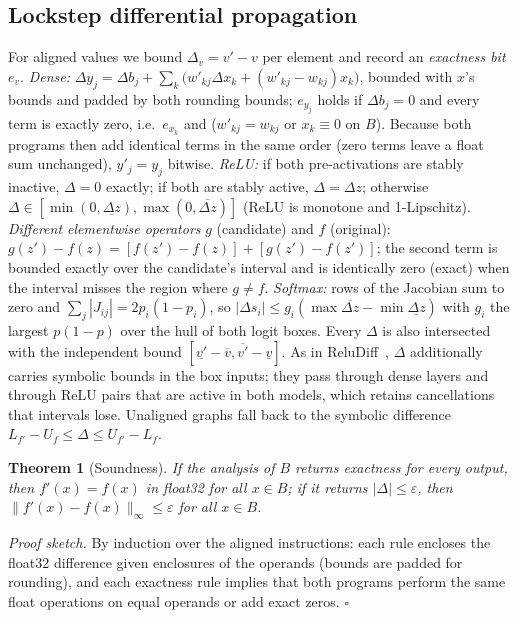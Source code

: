 \documentclass[conference]{IEEEtran}
\newtheorem{theorem}{Theorem}
\begin{document}
\subsection{Lockstep differential propagation}
For aligned values we bound $\Delta_v=v'-v$ per element and record an \emph{exactness bit} $e_v$.
\emph{Dense:} $\Delta y_j=\Delta b_j+\sum_k\big(w'_{kj}\Delta x_k+(w'_{kj}-w_{kj})x_k\big)$, bounded with $x$'s bounds and padded by both rounding bounds; $e_{y_j}$ holds if $\Delta b_j=0$ and every term is exactly zero, i.e.\ $e_{x_k}$ and ($w'_{kj}=w_{kj}$ or $x_k\equiv0$ on $B$). Because both programs then add identical terms in the same order (zero terms leave a float sum unchanged), $y'_j=y_j$ bitwise.
\emph{ReLU:} if both pre-activations are stably inactive, $\Delta=0$ exactly; if both are stably active, $\Delta=\Delta z$; otherwise $\Delta\in[\min(0,\underline{\Delta z}),\max(0,\overline{\Delta z})]$ (ReLU is monotone and 1-Lipschitz).
\emph{Different elementwise operators} $g$ (candidate) and $f$ (original): $g(z')-f(z)=[f(z')-f(z)]+[g(z')-f(z')]$; the second term is bounded exactly over the candidate's interval and is identically zero (exact) when the interval misses the region where $g\ne f$.
\emph{Softmax:} rows of the Jacobian sum to zero and $\sum_j|J_{ij}|=2p_i(1-p_i)$, so $|\Delta s_i|\le g_i(\max\overline{\Delta z}-\min\underline{\Delta z})$ with $g_i$ the largest $p(1-p)$ over the hull of both logit boxes.
Every $\Delta$ is also intersected with the independent bound $[\underline{v'}-\overline{v},\overline{v'}-\underline{v}]$. As in ReluDiff~\cite{reludiff,neurodiff}, $\Delta$ additionally carries symbolic bounds in the box inputs; they pass through dense layers and through ReLU pairs that are active in both models, which retains cancellations that intervals lose. Unaligned graphs fall back to the symbolic difference $L_{f'}-U_f\le\Delta\le U_{f'}-L_f$.

\begin{theorem}[Soundness]
If the analysis of $B$ returns exactness for every output, then $f'(x)=f(x)$ in float32 for all $x\in B$; if it returns $|\Delta|\le\varepsilon$, then $\|f'(x)-f(x)\|_\infty\le\varepsilon$ for all $x\in B$.
\end{theorem}
\noindent\emph{Proof sketch.} By induction over the aligned instructions: each rule encloses the float32 difference given enclosures of the operands (bounds are padded for rounding), and each exactness rule implies that both programs perform the same float operations on equal operands or add exact zeros. \hfill$\square$
\end{document}
